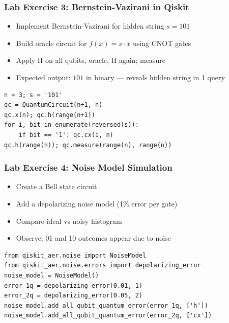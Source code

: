 \begin{frame}[fragile]\frametitle{Lab Exercise 3: Bernstein-Vazirani in Qiskit}
\begin{itemize}
\item Implement Bernstein-Vazirani for hidden string $s = 101$
\item Build oracle circuit for $f(x) = s \cdot x$ using CNOT gates
\item Apply H on all qubits, oracle, H again; measure
\item Expected output: $101$ in binary --- reveals hidden string in 1 query
\end{itemize}
\begin{verbatim}
n = 3; s = '101'
qc = QuantumCircuit(n+1, n)
qc.x(n); qc.h(range(n+1))
for i, bit in enumerate(reversed(s)):
    if bit == '1': qc.cx(i, n)
qc.h(range(n)); qc.measure(range(n), range(n))
\end{verbatim}
\end{frame}

\begin{frame}[fragile]\frametitle{Lab Exercise 4: Noise Model Simulation}
\begin{itemize}
\item Create a Bell state circuit
\item Add a depolarizing noise model (1\% error per gate)
\item Compare ideal vs noisy histogram
\item Observe: 01 and 10 outcomes appear due to noise
\end{itemize}
\begin{verbatim}
from qiskit_aer.noise import NoiseModel
from qiskit_aer.noise.errors import depolarizing_error
noise_model = NoiseModel()
error_1q = depolarizing_error(0.01, 1)
error_2q = depolarizing_error(0.05, 2)
noise_model.add_all_qubit_quantum_error(error_1q, ['h'])
noise_model.add_all_qubit_quantum_error(error_2q, ['cx'])
\end{verbatim}
\end{frame}

